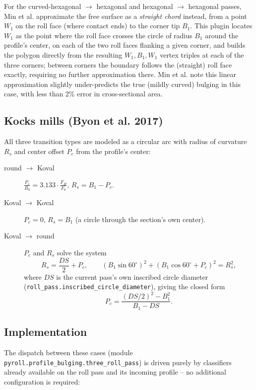 \documentclass[11pt]{PyRollDocs}
\begin{document}
    For the curved-hexagonal $\to$ hexagonal and hexagonal $\to$ hexagonal passes, Min
    et al. approximate the free surface as a \emph{straight chord} instead, from a
    point $W_1$ on the roll face (where contact ends) to the corner tip $B_1$. This
    plugin locates $W_1$ as the point where the roll face crosses the circle of radius
    $B_1$ around the profile's center, on each of the two roll faces flanking a given
    corner, and builds the polygon directly from the resulting $W_1, B_1, W_1$ vertex
    triples at each of the three corners; between corners the boundary follows the
    (straight) roll face exactly, requiring no further approximation there. Min et al.
    note this linear approximation slightly under-predicts the true (mildly curved)
    bulging in this case, with less than 2\% error in cross-sectional area.

    \subsection{Kocks mills (Byon et al. 2017)}\label{subsec:byon}

    All three transition types are modeled as a circular arc with radius of curvature
    $R_s$ and center offset $P_c$ from the profile's center:

    \begin{description}
        \item[round $\to$ Koval] $\displaystyle \frac{P_c}{B_0} = 3.133 \cdot
        \frac{F_H}{F_0}$, \quad $R_s = B_1 - P_c$.
        \item[Koval $\to$ Koval] $P_c = 0$, \quad $R_s = B_1$ (a circle through the
        section's own center).
        \item[Koval $\to$ round] $P_c$ and $R_s$ solve the system
        \[
            R_s = \frac{DS}{2} + P_c, \qquad
            (B_1 \sin 60^\circ)^2 + (B_1 \cos 60^\circ + P_c)^2 = R_s^2,
        \]
        where $DS$ is the current pass's own inscribed circle diameter
        (\texttt{roll\_pass.inscribed\_circle\_diameter}), giving the closed form
        \[
            P_c = \frac{(DS/2)^2 - B_1^2}{B_1 - DS}.
        \]
    \end{description}

    \subsection{Implementation}\label{subsec:three-roll-impl}

    The dispatch between these cases (module \texttt{pyroll.profile\_bulging.three\_roll\_pass})
    is driven purely by classifiers already available on the roll pass and its incoming
    profile -- no additional configuration is required:
\end{document}
